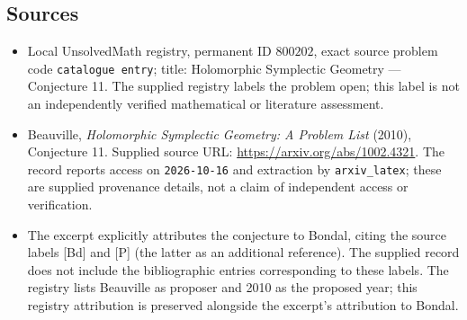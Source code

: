 \documentclass[11pt]{article}
\begin{document}
\subsection{Sources}
\begin{itemize}
\item Local UnsolvedMath registry, permanent ID \(800202\), exact source problem code \texttt{catalogue entry}; title: Holomorphic Symplectic Geometry --- Conjecture 11. The supplied registry labels the problem open; this label is not an independently verified mathematical or literature assessment.
\item Beauville, \emph{Holomorphic Symplectic Geometry: A Problem List} (2010), Conjecture 11. Supplied source URL: \url{https://arxiv.org/abs/1002.4321}. The record reports access on \texttt{2026-10-16} and extraction by \texttt{arxiv\_latex}; these are supplied provenance details, not a claim of independent access or verification.
\item The excerpt explicitly attributes the conjecture to Bondal, citing the source labels [Bd] and [P] (the latter as an additional reference). The supplied record does not include the bibliographic entries corresponding to these labels. The registry lists Beauville as proposer and 2010 as the proposed year; this registry attribution is preserved alongside the excerpt's attribution to Bondal.
\end{itemize}
\end{document}
